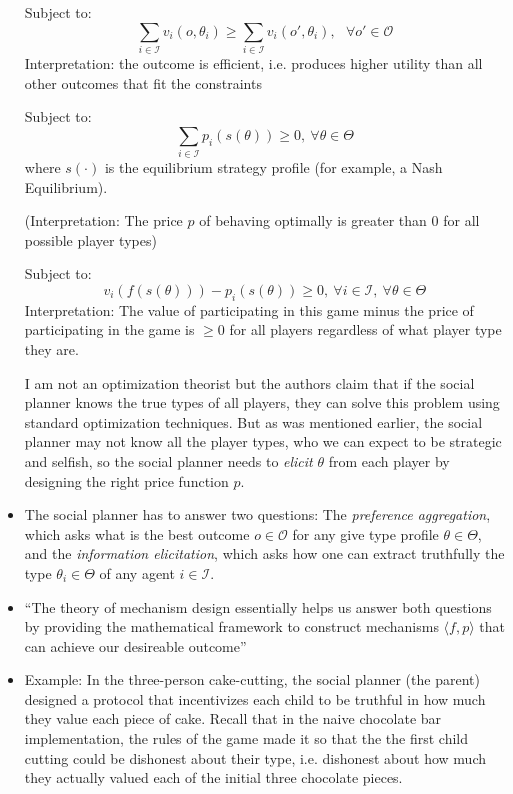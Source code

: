 \documentclass[11pt]{article}
\begin{document}
\begin{itemize}
    Subject to:
    \begin{equation}
        \sum_{i \in \mathcal{I}} v_i(o,\theta_i) \geq \sum_{i \in \mathcal{I}}v_i(o', \theta_i),~~~\forall o' \in \mathcal{O}
    \end{equation}
    Interpretation: the outcome is efficient, i.e. produces higher utility than all other outcomes that fit the constraints

    Subject to:
    \begin{equation}
        \sum_{i \in \mathcal{I}} p_i(s(\theta)) \geq 0,~\forall \theta\in\Theta
    \end{equation}
    where $s(\cdot)$ is the equilibrium strategy profile (for example, a Nash Equilibrium).
    
    (Interpretation: The price $p$ of behaving optimally is greater than $0$ for all possible player types)


    Subject to:
    \begin{equation}
        v_i(f(s(\theta))) - p_i(s(\theta)) \geq 0,~\forall i\in\mathcal{I},~\forall \theta \in \Theta
    \end{equation}
    Interpretation: The value of participating in this game minus the price of participating in the game is $\geq 0$  for all players regardless of what player type they are. 

    I am not an optimization theorist but the authors claim that if the social planner knows the true types of all players, they can solve this problem using standard optimization techniques. But as was mentioned earlier, the social planner may not know all the player types, who we can expect to be strategic and selfish, so the social planner needs to {\it elicit} $\theta$ from each player by designing the right price function $p$. 

    \item The social planner has to answer two questions: The {\it preference aggregation}, which asks what is the best outcome $o \in \mathcal{O}$ for any give type profile $\theta \in \Theta$, and the {\it information elicitation}, which asks how one can extract truthfully the type $\theta_i \in \Theta$ of any agent $i \in \mathcal{I}$. 
    \item ``The theory of mechanism design essentially helps us answer both questions by providing the mathematical framework to construct mechanisms $\langle f, p \rangle$ that can achieve our desireable outcome''
    \item Example: In the three-person cake-cutting, the social planner (the parent) designed a protocol that incentivizes each child to be truthful in how much they value each piece of cake. Recall that in the naive chocolate bar implementation, the rules of the game made it so that the the first child cutting could be dishonest about their type, i.e. dishonest about how much they actually valued each of the initial three chocolate pieces. 

\end{itemize}
\end{document}
